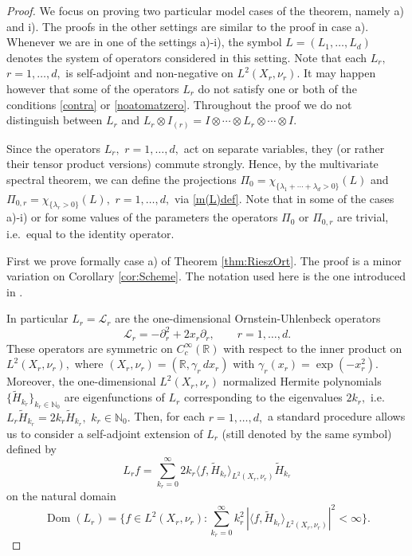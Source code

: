 \documentclass[leqno,12pt]{amsart}
\theoremstyle{definition}
\theoremstyle{remark}
\begin{document}
\begin{proof}
We focus on proving two particular model cases of the theorem, namely a) and i). The proofs in the other settings are similar to the proof in case a). Whenever we are in one of the settings a)-i), the symbol $L=(L_1,\ldots,L_d)$ denotes the system of operators considered in this setting. Note that each $L_r,$ $r=1,\ldots,d,$ is self-adjoint and non-negative on $L^2(X_r,\nu_r).$ It may happen however that some of the operators $L_r$ do not satisfy one or both of the conditions \eqref{contra} or \eqref{noatomatzero}. Throughout the proof we do not distinguish between $L_r$ and $L_r\otimes I_{(r)}=I\otimes\cdots \otimes L_r\otimes \cdots \otimes I.$

Since the operators $L_r,$ $r=1,\ldots,d,$ act on separate variables, they (or rather their tensor product versions) commute strongly. Hence, by the multivariate spectral theorem, we can define the projections $\Pi_{0}=\chi_{\{{\lambda}_1+\cdots+{\lambda}_d>0\}}(L)$ and $\Pi_{0,r}=\chi_{\{{\lambda}_r>0\}}(L),$ $r=1,\ldots,d,$ via \eqref{m(L)def}. Note that in some of the cases a)-i) or for some values of the parameters the operators $\Pi_0$ or $\Pi_{0,r}$ are trivial, i.e.\ equal to the identity operator.

First we prove formally case a) of Theorem \ref{thm:RieszOrt}. The proof is a minor variation on Corollary \ref{cor:Scheme}. The notation used here is the one introduced in \cite[p. 689]{NSRiesz}.

In particular $L_r={\mathcal{L}}_{r}$ are the one-dimensional Ornstein-Uhlenbeck operators $${\mathcal{L}}_r=-\partial_r^2+2 x_r \partial_r,\qquad r=1,\ldots,d.$$ These operators are symmetric on $C_c^{\infty}(\mathbb{R})$ with respect to the inner product on $L^2(X_r,\nu_r),$ where $(X_r,\nu_r)=(\mathbb{R},\gamma_r\,dx_r)$ with $\gamma_r(x_r)=\exp(-x_r^2).$ Moreover, the one-dimensional $L^2(X_r,\nu_r)$ normalized Hermite polynomials $\{{\tilde{H}}_{k_r}\}_{k_r\in \mathbb{N}_0}$ are eigenfunctions of $L_r$ corresponding to the eigenvalues $2k_r,$ i.e.\ $L_r{\tilde{H}}_{k_r}=2k_r{\tilde{H}}_{k_r},$ $k_r\in\mathbb{N}_0.$ Then, for each $r=1,\ldots,d,$ a standard procedure allows us to consider a self-adjoint extension of $L_r$ (still denoted by the same symbol) defined by
$$L_rf=\sum_{k_r=0}^{\infty}2k_r\langle f, {\tilde{H}}_{k_r}\rangle_{L^2(X_r,\nu_r)} {\tilde{H}}_{k_r}$$
on the natural domain
$$\operatorname{Dom}(L_r)=\bigg\{f\in L^2(X_r,\nu_r)\colon \sum_{k_r=0}^{\infty}k_r^2\,|\langle f, {\tilde{H}}_{k_r}\rangle_{L^2(X_r,\nu_r)}|^2<\infty\bigg\}.$$


\end{proof}
\end{document}
